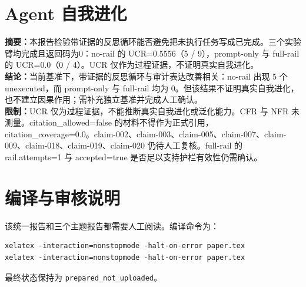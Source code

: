 \documentclass[UTF8]{ctexart}
\begin{document}
\section{Agent 自我进化}
\textbf{摘要：}本报告检验带证据的反思循环能否避免把未执行任务写成已完成。三个实验臂均完成且返回码为0：no-\allowbreak{}rail 的 UCR=0.5556（5 / 9），prompt-\allowbreak{}only 与 full-\allowbreak{}rail 的 UCR=0.0（0 / 4）。UCR 仅作为过程证据，不证明真实自我进化。\\
\textbf{结论：}当前基准下，带证据的反思循环与审计表达改善相关：no-\allowbreak{}rail 出现 5 个 unexecuted，而 prompt-\allowbreak{}only 与 full-\allowbreak{}rail 均为 0。但该结果不证明真实自我进化，也不建立因果作用；需补充独立基准并完成人工确认。\\
\textbf{限制：}UCR 仅为过程证据，不能推断真实自我进化或泛化能力。CFR 与 NFR 未测量。citation\_\allowbreak{}allowed=false 的材料不得作为正式引用，citation\_\allowbreak{}coverage=0.0。claim-\allowbreak{}002、claim-\allowbreak{}003、claim-\allowbreak{}005、claim-\allowbreak{}007、claim-\allowbreak{}009、claim-\allowbreak{}018、claim-\allowbreak{}019、claim-\allowbreak{}020 仍待人工复核。full-\allowbreak{}rail 的 rail.attempts=1 与 accepted=true 是否足以支持护栏有效性仍需确认。
\section{编译与审核说明}
该统一报告和三个主题报告都需要人工阅读。编译命令为：
\begin{verbatim}
xelatex -interaction=nonstopmode -halt-on-error paper.tex
xelatex -interaction=nonstopmode -halt-on-error paper.tex
\end{verbatim}
最终状态保持为 \texttt{prepared\_not\_uploaded}。
\end{document}
